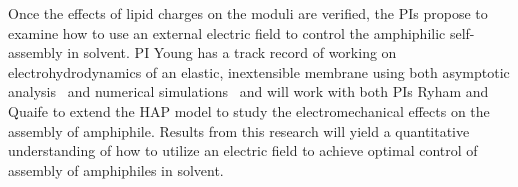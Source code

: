 Once the effects of lipid charges on the moduli are verified, the PIs
propose to examine how to use an external electric field to control the
amphiphilic self-assembly in solvent. PI Young has a track record of
working on electrohydrodynamics of an elastic, inextensible membrane
using both asymptotic analysis~\cite{Nganguia2013_PRE, Young2014_JFM,
Young2015_PoF} and numerical simulations~\cite{Nganguia2015_CiCP} and
will work with both PIs Ryham and Quaife to extend the HAP model to
study the electromechanical effects on the assembly of amphiphile.
Results from this research will yield a quantitative understanding of
how to utilize an electric field to achieve optimal control of assembly
of amphiphiles in solvent.




